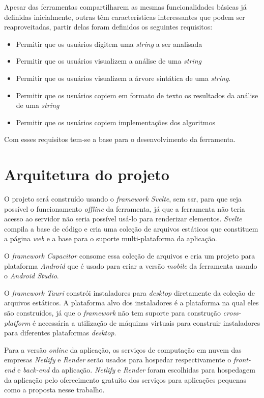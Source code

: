 Apesar das ferramentas compartilharem as mesmas funcionalidades básicas já definidas inicialmente, outras têm características interessantes que podem ser reaproveitadas, partir delas foram definidos os seguintes requisitos:
\begin{itemize}[label={$\sbullet$}]
    \item Permitir que os usuários digitem uma \textit{string} a ser analisada
    \item Permitir que os usuários visualizem a análise de uma \textit{string}
    \item Permitir que os usuários visualizem a árvore sintática de uma \textit{string}. 
    \item Permitir que os usuários copiem em formato de texto os resultados da análise de uma \textit{string}
    \item Permitir que os usuários copiem implementações dos algoritmos 
\end{itemize}
Com esses requisitos tem-se a base para o desenvolvimento da ferramenta.

\section{Arquitetura do projeto}
O projeto será construído usando o \textit{framework Svelte}, sem \gls{ssr}, para que seja possível o funcionamento \textit{offline} da ferramenta, já que a ferramenta não teria acesso ao servidor não seria possível usá-lo para renderizar elementos. \textit{Svelte} compila a base de código e cria uma coleção de arquivos estáticos que constituem a página \textit{web} e a base para o suporte multi-plataforma da aplicação.

O \textit{framework Capacitor} consome essa coleção de arquivos e cria um projeto para plataforma \textit{Android} que é usado para criar a versão \textit{mobile} da ferramenta usando o \textit{Android Studio}. 

O \textit{framework Tauri} constrói instaladores para \textit{desktop} diretamente da coleção de arquivos estáticos. A plataforma alvo dos instaladores é a plataforma na qual eles são construídos, já que o \textit{framework} não tem suporte para construção \textit{cross-platform} é necessária a utilização de máquinas virtuais para construir instaladores para diferentes plataformas \textit{desktop}.

Para a versão \textit{online} da aplicação, os serviços de computação em nuvem das empresas \textit{Netlify} e \textit{Render} serão usados para hospedar respectivamente o \textit{front-end} e \textit{back-end} da aplicação. \textit{Netlify} e \textit{Render} foram escolhidas para hospedagem da aplicação pelo oferecimento gratuito dos serviços para aplicações pequenas como a proposta nesse trabalho.

